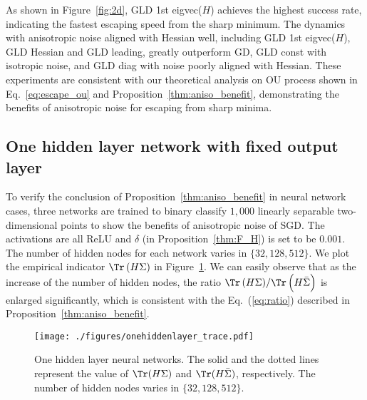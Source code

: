 \documentclass{article}
\begin{document}
As shown in Figure~\ref{fig:2d}, GLD 1st eigvec($H$) achieves the highest success rate, indicating the fastest escaping speed from the sharp minimum.
The dynamics with anisotropic noise aligned with Hessian well, including GLD 1st eigvec($H$), GLD Hessian and GLD leading, greatly outperform GD, GLD const with isotropic noise, and GLD diag with noise poorly aligned with Hessian.
These experiments are consistent with our theoretical analysis on OU process shown in Eq.~\eqref{eq:escape_ou} and Proposition~\ref{thm:aniso_benefit}, demonstrating the benefits of anisotropic noise for escaping from sharp minima.

\subsection{One hidden layer network with fixed output layer}
To verify the conclusion of Proposition~\ref{thm:aniso_benefit} in neural network cases, 
three networks are trained to binary classify $1,000$ linearly separable two-dimensional points to show the benefits of anisotropic noise of SGD. 
The activations are all ReLU and $\delta$ (in Proposition~\ref{thm:F_H}) is set to be $0.001$.
The number of hidden nodes for each network varies in $\{32,128,512\}$.
We plot the empirical indicator $\Tr \left(H\Sigma\right)$ in Figure~\ref{fig:onehiddenlayer}.
We can easily observe that as the increase of the number of hidden nodes, the ratio ${\Tr \left(H\Sigma\right)}/{\Tr \left(H\bar{\Sigma}\right)}$ is enlarged significantly, which is consistent with the Eq.~(\ref{eq:ratio}) described in Proposition~\ref{thm:aniso_benefit}.


\begin{figure}
\centering
\texttt{[image: ./figures/onehiddenlayer\_trace.pdf]}
\vspace{-4mm}
\caption{\small One hidden layer neural networks.
The solid and the dotted lines represent the value of $\Tr(H\Sigma)$ and $\Tr(H\bar{\Sigma})$, respectively.
The number of hidden nodes varies in $\{32, 128, 512\}$.} 
\label{fig:onehiddenlayer}
\vspace{-4mm}
\end{figure}

\vskip -3mm
\end{document}
